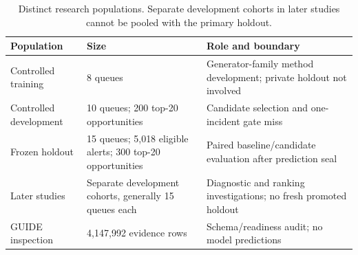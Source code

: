 \begin{table}[ht]\centering\small\caption{Distinct research populations. Separate development cohorts in later studies cannot be pooled with the primary holdout.}\label{tab:cohorts}\begin{tabularx}{\linewidth}{@{}p{32mm}p{27mm}Y@{}}\toprule Population & Size & Role and boundary\\\midrule Controlled training & 8 queues & Generator-family method development; private holdout not involved\\ Controlled development & 10 queues; 200 top-20 opportunities & Candidate selection and one-incident gate miss\\ Frozen holdout & 15 queues; 5,018 eligible alerts; 300 top-20 opportunities & Paired baseline/candidate evaluation after prediction seal\\ Later studies & Separate development cohorts, generally 15 queues each & Diagnostic and ranking investigations; no fresh promoted holdout\\ GUIDE inspection & 4,147,992 evidence rows & Schema/readiness audit; no model predictions\\\bottomrule\end{tabularx}\end{table}

